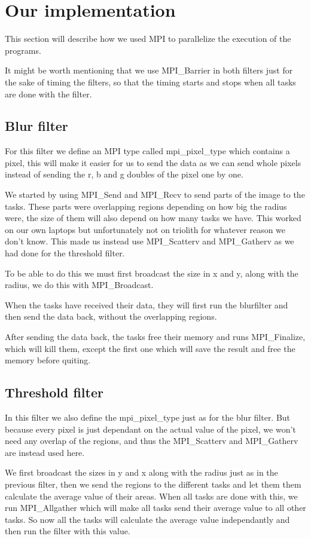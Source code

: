 \documentclass[titlepage, a4paper]{article}
\begin{document}
\section{Our implementation}
This section will describe how we used MPI to parallelize the execution of the programs.

It might be worth mentioning that we use MPI\_Barrier in both filters just for the sake of timing the filters, so that the timing starts and stops when all tasks are done with the filter.

\subsection{Blur filter}
For this filter we define an MPI type called mpi\_pixel\_type which contains a pixel, this will make it easier for us to send the data as we can send whole pixels instead of sending the r, b and g doubles of the pixel one by one.

We started by using MPI\_Send and MPI\_Recv to send parts of the image to the tasks. These parts were overlapping regions depending on how big the radius were, the size of them will also depend on how many tasks we have. This worked on our own laptops but unfortunately not on triolith for whatever reason we don't know. This made us instead use MPI\_Scatterv and MPI\_Gatherv as we had done for the threshold filter.

To be able to do this we must first broadcast the size in x and y, along with the radius, we do this with MPI\_Broadcast.

When the tasks have received their data, they will first run the blurfilter and then send the data back, without the overlapping regions.

After sending the data back, the tasks free their memory and runs MPI\_Finalize, which will kill them, except the first one which will save the result and free the memory before quiting.

\subsection{Threshold filter}
In this filter we also define the mpi\_pixel\_type just as for the blur filter. But because every pixel is just dependant on the actual value of the pixel, we won't need any overlap of the regions, and thus the MPI\_Scatterv and MPI\_Gatherv are instead used here.

We first broadcast the sizes in y and x along with the radius just as in the previous filter, then we send the regions to the different tasks and let them them calculate the average value of their areas. When all tasks are done with this, we run MPI\_Allgather which will make all tasks send their average value to all other tasks. So now all the tasks will calculate the average value independantly and then run the filter with this value.
\end{document}
